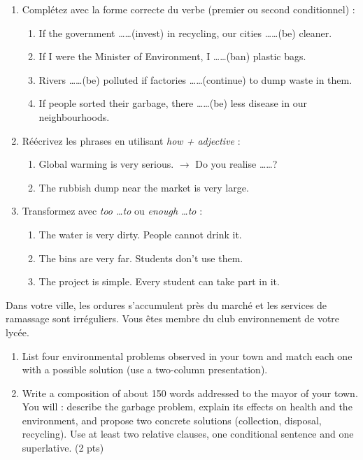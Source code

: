 \documentclass[11pt]{article}
\begin{document}
\begin{exercice}
\begin{enumerate}
\item Complétez avec la forme correcte du verbe (premier ou second conditionnel) :
\begin{enumerate}
\item If the government \ldots\ldots (invest) in recycling, our cities \ldots\ldots (be) cleaner.
\item If I were the Minister of Environment, I \ldots\ldots (ban) plastic bags.
\item Rivers \ldots\ldots (be) polluted if factories \ldots\ldots (continue) to dump waste in them.
\item If people sorted their garbage, there \ldots\ldots (be) less disease in our neighbourhoods.
\end{enumerate}
\item Réécrivez les phrases en utilisant \textit{how + adjective} :
\begin{enumerate}
\item Global warming is very serious. $\rightarrow$ Do you realise \ldots\ldots ?
\item The rubbish dump near the market is very large.
\end{enumerate}
\item Transformez avec \textit{too \ldots to} ou \textit{enough \ldots to} :
\begin{enumerate}
\item The water is very dirty. People cannot drink it.
\item The bins are very far. Students don't use them.
\item The project is simple. Every student can take part in it.
\end{enumerate}
\end{enumerate}
\end{exercice}

\begin{exercice}
Dans votre ville, les ordures s'accumulent près du marché et les services de ramassage sont irréguliers. Vous êtes membre du club environnement de votre lycée.
\begin{enumerate}
\item List four environmental problems observed in your town and match each one with a possible solution (use a two-column presentation).
\item Write a composition of about 150 words addressed to the mayor of your town. You will : describe the garbage problem, explain its effects on health and the environment, and propose two concrete solutions (collection, disposal, recycling). Use at least two relative clauses, one conditional sentence and one superlative. (2 pts)
\end{enumerate}
\end{exercice}
\end{document}
